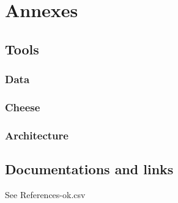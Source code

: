 \documentclass[8pt]{article} %
\begin{document}



\section{Annexes}



\subsection{Tools}

{\footnotesize
\subsubsection{Data}


%
\subsubsection{Cheese}


\subsubsection{Architecture}
}

\subsection{Documentations and links}
See References-ok.csv
\end{document}
